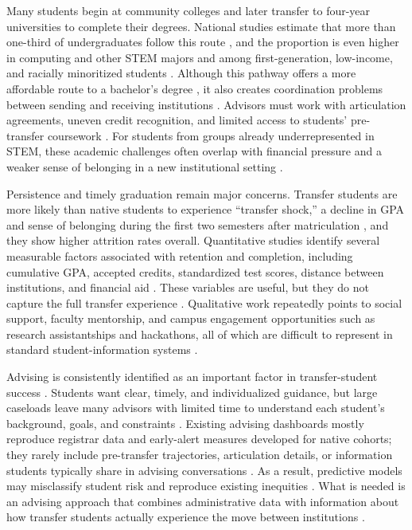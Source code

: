 \documentclass[letterpaper,11pt]{article}
\begin{document}
Many students begin at community colleges and later transfer to four-year universities to complete their degrees. National studies estimate that more than one-third of undergraduates follow this route \parencite{monaghan2015}, and the proportion is even higher in computing and other STEM majors and among first-generation, low-income, and racially minoritized students \parencite{computingtransfer2024,wali2025transfer}. Although this pathway offers a more affordable route to a bachelor's degree \parencite{factoranalysis2023}, it also creates coordination problems between sending and receiving institutions \parencite{nguyen2025school}. Advisors must work with articulation agreements, uneven credit recognition, and limited access to students' pre-transfer coursework \parencite{nguyen2024community,roksa2008credits}. For students from groups already underrepresented in STEM, these academic challenges often overlap with financial pressure and a weaker sense of belonging in a new institutional setting \parencite{computingtransfer2024,nguyen2025school}.

Persistence and timely graduation remain major concerns. Transfer students are more likely than native students to experience ``transfer shock,'' a decline in GPA and sense of belonging during the first two semesters after matriculation \parencite{jaggars2025}, and they show higher attrition rates overall. Quantitative studies identify several measurable factors associated with retention and completion, including cumulative GPA, accepted credits, standardized test scores, distance between institutions, and financial aid \parencite{jaggars2025,roksa2008credits,factoranalysis2023}. These variables are useful, but they do not capture the full transfer experience \parencite{nguyen2025school}. Qualitative work repeatedly points to social support, faculty mentorship, and campus engagement opportunities such as research assistantships and hackathons, all of which are difficult to represent in standard student-information systems \parencite{thiry2023}.

Advising is consistently identified as an important factor in transfer-student success \parencite{thiry2023,lukszo2020}. Students want clear, timely, and individualized guidance, but large caseloads leave many advisors with limited time to understand each student's background, goals, and constraints \parencite{preposttransfer2014,nguyen2025school}. Existing advising dashboards mostly reproduce registrar data and early-alert measures developed for native cohorts; they rarely include pre-transfer trajectories, articulation details, or information students typically share in advising conversations \parencite{nguyen2024community,nguyen2025school}. As a result, predictive models may misclassify student risk and reproduce existing inequities \parencite{computingtransfer2024,socialcognitive2022}. What is needed is an advising approach that combines administrative data with information about how transfer students actually experience the move between institutions \parencite{nguyen2025school}.
\end{document}
